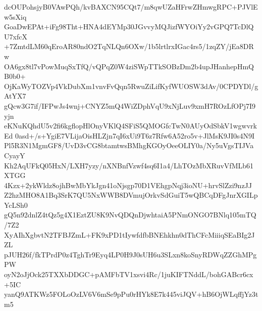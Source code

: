 dcOUPohsjyB0VAwPQh/kvBAXCN95CQt7/m8qwUZaHFrwZHmwgRPC+PJVlEw5sXiq
GoaDwEPAt+iFg98Tht+HNA4dEYMp30JGvvyMQJizfWYOiYy2vGPQ7TcDlQU7xfcX
+7ZmtdLM60qEroAR80ndO2TqNLQn6OXw/1b5lrtlrxIGac4rs5/1zqZY/jEa8DRw
OA6gx8tl7vPowMuqSxTfQ/vQPqZ0W4ziSWpTTkSOBzDm2b4upJHanhepHmQB0b0+
OjKaWyTOZVp4VkDubXm1vnvFvQqn5RwuZiLifKyfWUOSW3dAv/0CPDYDl/gAtYX7
gQcw3G7if/IFPwJs4wnj+CNYZ5mQ4WiZDphVqU9xNjLuv9xmH7ROzLfOPj7I9yjn
eKNuKQhdU5v2fi6kgflopHlOnyVKlQ4SFiS5QMOGfcTwN0AUyOdSbkV1wgwvrkEd
0asd+/s+YgiE7VLijaOisHLZjn7qI6xUi9T6z7Rfw6A52ro5v+JlMsK9JI0s4N9I
Pl5R3N1MgmGF8/UvD3vCG8btamtwsBMhgKGOyOeeOLIY0a/Ny5uVgsTIJVaCyayY
Kh2AqUFkQ05HxN/LXH7yzy/nXNBnfVzwf4sq6I1a4/LhTOzMbXRuvVfMLb61XTGG
4Kzx+2ykWldz8ojhBwMbYkJgn41oNjsgp70D1VEhgpNqj3ioNU+hrvSlZzi9nzJJ
Z2hzMHO8A1Bq3SrK7QU5NxWWB8DVmujOrkvSdGuiT5wQBCqDFgJnrXGILpYcLSh0
gQ5n92dnlZ4tQz5g4X1EztZU8K9NvQDQnDjwhtaiA5PNmONGO7BNlq105mTQ/7Z2
XyAIhXgbvtN2TFBJZmL+FK9xPD1tIywfdfbBNEhkhn0dThCFcMiiiqSEaBIg2JZL
pJUH26f/fkTPrdP0z4TghTr9Eyq4LP0H9J0sUH6u3SLxn8koSnyRDWqZZGhMPgPW
oyN2oJjOck25TXXbDDGC+pAMFbTV1xsvi4Rc/1juKIFTNddL/bohGABcr6cx+5IC
yanQ9ATKWz5FOLoOzLV6V6mSe9pPu0rHYk8E7k445viJQV+hB6OjWLqffjYz3tm5
